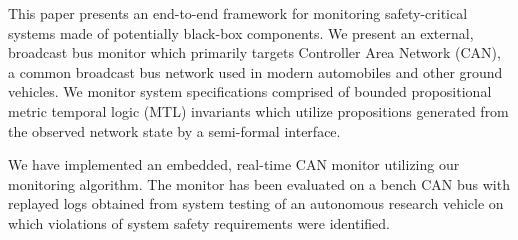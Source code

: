This paper presents an end-to-end framework for monitoring safety-critical systems made of potentially black-box components. 
We present an external, broadcast bus monitor which primarily targets Controller Area Network (CAN), a common broadcast bus network used in modern automobiles and other ground vehicles. We monitor system specifications comprised of bounded propositional metric temporal logic (MTL) invariants which utilize propositions generated from the observed network state by a semi-formal interface.

We have implemented an embedded, real-time CAN monitor utilizing our monitoring algorithm. The monitor has been evaluated on a bench CAN bus with replayed logs obtained from system testing of an autonomous research vehicle on which violations of system safety requirements were identified.
